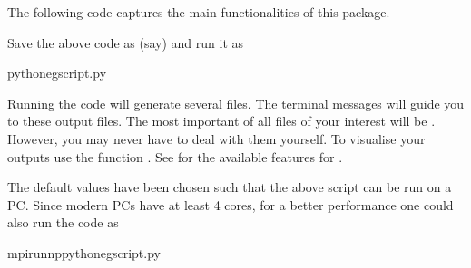 \documentclass[letterpaper,10pt,english]{sphinxmanual}
\begin{document}
\sphinxAtStartPar
The following code captures the main functionalities of this package.

\begin{sphinxVerbatim}[commandchars=\\\{\}]
   

  



\end{sphinxVerbatim}

\sphinxAtStartPar
Save the above code as (say)  and run it as

\begin{sphinxVerbatim}[commandchars=\\\{\}]
pythoneg\PYGZus{}script.py
\end{sphinxVerbatim}

\sphinxAtStartPar
Running the code will generate several files. The terminal messages will
guide you to these output files. The most important of all files of your
interest will be . However, you may never have to deal
with them yourself. To visualise your outputs use the function
. See {\hyperref[\detokenize{api:api}]{}} for the available features for .

\sphinxAtStartPar
The default values have been chosen such that the above script can be
run on a PC. Since modern PCs have at least 4 cores, for a better
performance one could also run the code as

\begin{sphinxVerbatim}[commandchars=\\\{\}]
mpirun\PYGZhy{}nppythoneg\PYGZus{}script.py
\end{sphinxVerbatim}
\end{document}
